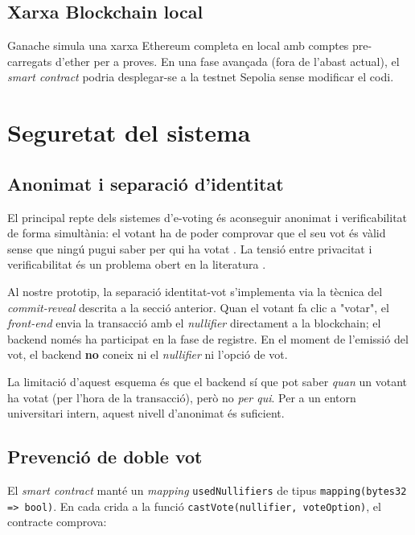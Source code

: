 \documentclass[12pt,a4paper,catalan]{article}
\begin{document}
\subsection{Xarxa Blockchain local}

Ganache simula una xarxa Ethereum completa en local amb comptes pre-carregats d'ether per a proves. En una fase avançada (fora de l'abast actual), el \textit{smart contract} podria desplegar-se a la testnet Sepolia sense modificar el codi.

\section{Seguretat del sistema}

\subsection{Anonimat i separació d'identitat}

El principal repte dels sistemes d'e-voting és aconseguir anonimat i verificabilitat de forma simultània: el votant ha de poder comprovar que el seu vot és vàlid sense que ningú pugui saber per qui ha votat \cite{berenjestanaki2024}. La tensió entre privacitat i verificabilitat és un problema obert en la literatura \cite{pvpbc2023}.

Al nostre prototip, la separació identitat-vot s'implementa via la tècnica del \textit{commit-reveal} descrita a la secció anterior. Quan el votant fa clic a "votar", el \textit{front-end} envia la transacció amb el \textit{nullifier} directament a la blockchain; el backend només ha participat en la fase de registre. En el moment de l'emissió del vot, el backend \textbf{no} coneix ni el \textit{nullifier} ni l'opció de vot.

La limitació d'aquest esquema és que el backend sí que pot saber \textit{quan} un votant ha votat (per l'hora de la transacció), però no \textit{per qui}. Per a un entorn universitari intern, aquest nivell d'anonimat és suficient.

\subsection{Prevenció de doble vot}

El \textit{smart contract} manté un \textit{mapping} \texttt{usedNullifiers} de tipus \texttt{mapping(bytes32 => bool)}. En cada crida a la funció \texttt{castVote(nullifier, voteOption)}, el contracte comprova:
\end{document}
